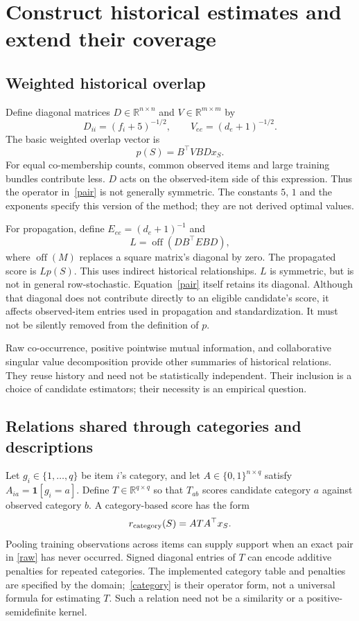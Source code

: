 \documentclass[11pt,a4paper]{article}
\newcommand{\off}{\operatorname{off}}
\begin{document}
\section{Construct historical estimates and extend their coverage}
\subsection{Weighted historical overlap}
Define diagonal matrices $D\in\mathbb R^{n\times n}$ and
$V\in\mathbb R^{m\times m}$ by
\[
 D_{ii}=(f_i+5)^{-1/2},\qquad V_{ee}=(d_e+1)^{-1/2}.
\]
The basic weighted overlap vector is
\begin{equation}\label{pair}
 p(S)=B^\top VBDx_S.
\end{equation}
For equal co-membership counts, common observed items and large training bundles
contribute less. $D$ acts on the observed-item side of this expression. Thus the
operator in~\eqref{pair} is not generally symmetric. The constants $5$, $1$ and the
exponents specify this version of the method; they are not derived optimal values.

For propagation, define $E_{ee}=(d_e+1)^{-1}$ and
\begin{equation}\label{propagation}
 L=\off(DB^\top EBD),
\end{equation}
where $\off(M)$ replaces a square matrix's diagonal by zero. The propagated score
is $Lp(S)$. This uses indirect historical relationships. $L$ is symmetric, but is
not in general row-stochastic. Equation~\eqref{pair} itself retains its diagonal.
Although that diagonal does not contribute directly to an eligible candidate's
score, it affects observed-item entries used in propagation and standardization.
It must not be silently removed from the definition of $p$.

Raw co-occurrence, positive pointwise mutual information, and collaborative singular
value decomposition provide other summaries of historical relations. They reuse
history and need not be statistically independent. Their inclusion is a choice of
candidate estimators; their necessity is an empirical question.

\subsection{Relations shared through categories and descriptions}
Let $g_i\in\{1,\ldots,q\}$ be item $i$'s category, and let
$A\in\{0,1\}^{n\times q}$ satisfy $A_{ia}=\mathbf1[g_i=a]$. Define
$T\in\mathbb R^{q\times q}$ so that $T_{ab}$ scores candidate category $a$ against
observed category $b$. A category-based score has the form
\begin{equation}\label{category}
 r_{\rm category}(S)=ATA^\top x_S.
\end{equation}
Pooling training observations across items can supply support when an exact pair in
\eqref{raw} has never occurred. Signed diagonal entries of $T$ can encode additive
penalties for repeated categories. The implemented category table and penalties are
specified by the domain;~\eqref{category} is their operator form, not a universal
formula for estimating $T$. Such a relation need not be a similarity or a
positive-semidefinite kernel.
\end{document}
